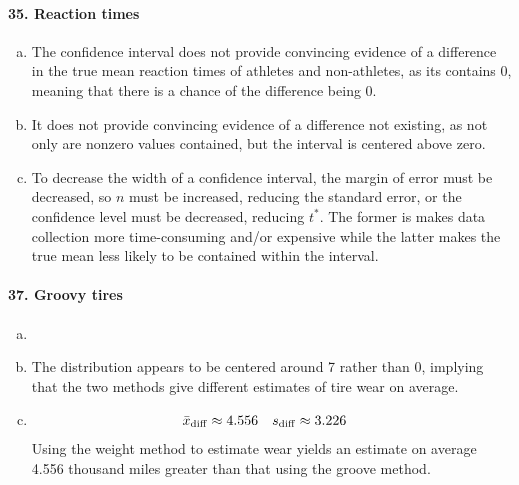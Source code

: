 \documentclass[../Homework]{subfiles}
\begin{document}
			\paragraph{35. Reaction times}
				\begin{enumerate}[a.]
					\item
						The confidence interval does not provide convincing evidence of a difference in the true mean reaction times of athletes and non-athletes, as its contains 0, meaning that there is a chance of the difference being 0.
					\item
						It does not provide convincing evidence of a difference not existing, as not only are nonzero values contained, but the interval is centered above zero.
					\item
						To decrease the width of a confidence interval, the margin of error must be decreased, so $n$ must be increased, reducing the standard error, or the confidence level must be decreased, reducing $t^*$. The former is makes data collection more time-consuming and/or expensive while the latter makes the true mean less likely to be contained within the interval.
				\end{enumerate}
			\paragraph{37. Groovy tires}
				\begin{enumerate}[a.]
					\item
						\
						\begin{center}
						\end{center}
					\item
						The distribution appears to be centered around 7 rather than 0, implying that the two methods give different estimates of tire wear on average.
					\item
						\begin{align*}
							\bar{x}_{\mathrm{diff}} &\approx 4.556 & s_{\mathrm{diff}} &\approx 3.226
						\end{align*}
						Using the weight method to estimate wear yields an estimate on average 4.556 thousand miles greater than that using the groove method.
				\end{enumerate}
\end{document}

